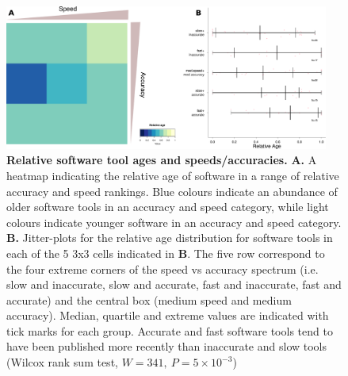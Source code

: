 \documentclass[fleqn,10pt]{SelfArx} %
\begin{document}





\begin{figure}[H]
\centering
\includegraphics[width=0.95\textwidth]{relAge.pdf}
\caption{{\bf Relative software tool ages and speeds/accuracies.}
{\bf A.} A heatmap indicating the relative age
  of software in a range of relative accuracy and speed rankings. Blue
  colours indicate an abundance of older software tools in an accuracy
  and speed category, while light colours indicate younger software in
  an accuracy and speed category.
  {\bf B.} Jitter-plots for the relative age distribution
  for software tools in each of the 5 3x3 cells indicated in {\bf B}. The
  five row correspond to the four extreme corners of the speed vs
  accuracy spectrum (i.e. slow and inaccurate, slow and accurate, fast
  and inaccurate, fast and accurate) and the central box (medium speed
  and medium accuracy). Median, quartile and extreme values are indicated with tick marks for each group.
  Accurate and fast software tools tend to have been published more recently than inaccurate and slow tools (Wilcox rank sum test, $W=341,~P=5\times 10^{-3}$)
   }
\label{fig:ageplot}
\end{figure}
\end{document}
